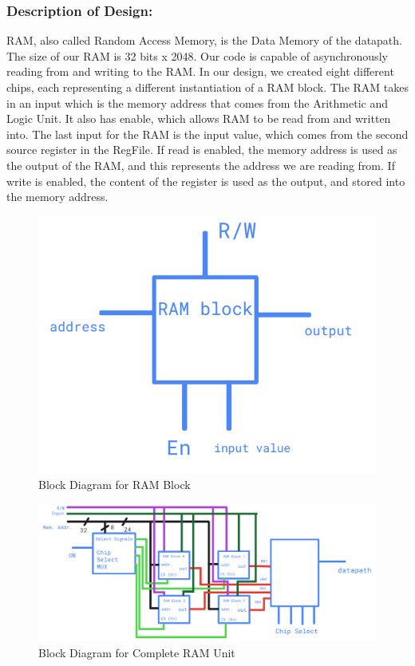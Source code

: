 \documentclass[10pt,letterpaper]{article}
\begin{document}
\subsubsection{Description of Design:}
RAM, also called Random Access Memory, is the Data Memory of the datapath. The size of our RAM is 32 bits x 2048. Our code is capable of asynchronously reading from and writing to the RAM. In our design, we created eight different chips, each representing a different instantiation of a RAM block. The RAM takes in an input which is the memory address that comes from the Arithmetic and Logic Unit. It also has enable, which allows RAM to be read from and written into. The last input for the RAM is the input value, which comes from the second source register in the RegFile. If read is enabled, the memory address is used as the output of the RAM, and this represents the address we are reading from. If write is enabled, the content of the register is used as the output, and stored into the memory address. 
\begin{figure}[H]
	\centering
	\includegraphics[width=0.7\linewidth]{Figures/RAMDesign}
	\caption{Block Diagram for RAM Block}
	\label{fig:ramdesign}
\end{figure}
\begin{figure}[H]
	\centering
	\includegraphics[width=0.7\linewidth]{Figures/RAMDesignComplete}
	\caption{Block Diagram for Complete RAM Unit}
	\label{fig:ramdesigncomplete}
\end{figure}
\end{document}
